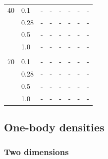 \begin{table} [H]
\begin{tabularx}{\textwidth}{l:l|XXXXXX}
		40 & 0.1 & - & - & - & - & - & -\\ 
		& 0.28 & - & - & - & - & - & -\\
		& 0.5 & - & - & - & - & - & -\\
		& 1.0 & - & - & - & - & - & -\\ \hdashline \\
		
		70 & 0.1 & - & - & - & - & - & -\\ 
		& 0.28 & - & - & - & - & - & -\\
		& 0.5 & - & - & - & - & - & -\\
		& 1.0 & - & - & - & - & - & -\\ \hline\hline
	\end{tabularx}
\end{table}

\subsection{One-body densities}
\subsubsection{Two dimensions}

